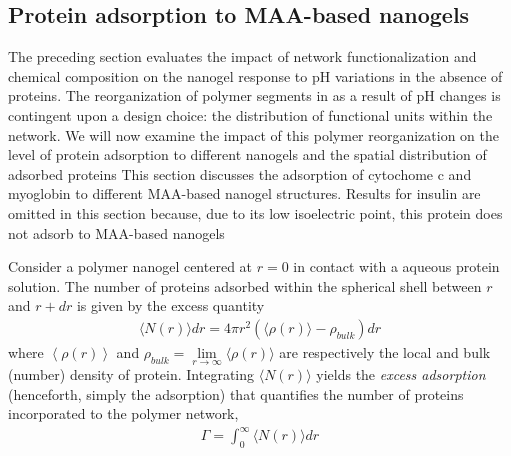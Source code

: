 \subsection{Protein adsorption to MAA-based nanogels}\label{sec:MAA-NGs}




The preceding section evaluates the impact of network functionalization and chemical composition on the nanogel response to pH variations in the absence of proteins.
The reorganization of polymer segments in as a result of pH changes is contingent upon a design choice: the distribution of functional units within the network.
We will now examine the impact of this polymer reorganization on the level of protein adsorption to different nanogels and the spatial distribution of adsorbed proteins
This section discusses the adsorption of cytochome c and myoglobin to different MAA-based nanogel structures.
Results for insulin are omitted in this section because, due to its low isoelectric point, this protein does not adsorb to MAA-based nanogels %





Consider a polymer nanogel centered at $r=0$ in contact with a aqueous protein solution.
The number of proteins adsorbed within the spherical shell between $r$ and $r+dr$ is given by the excess quantity
%
\begin{align}
     \langle N(r)\rangle dr = 4\pi r^2 \left(\langle\rho(r)\rangle - \rho_{bulk}\right) dr
\end{align}
%
where $\left<\rho(r)\right>$ and $\rho_{bulk}=\lim\limits_{r\to \infty } \langle\rho(r)\rangle$ are respectively the local and bulk (number) density of protein.
Integrating $\langle N(r)\rangle$ yields the \emph{excess adsorption} (henceforth, simply the adsorption) that quantifies the number of proteins incorporated to the polymer network,
%
\begin{align}
    \Gamma =  \int_0^\infty{  \langle N(r)\rangle dr}
\end{align}
%









